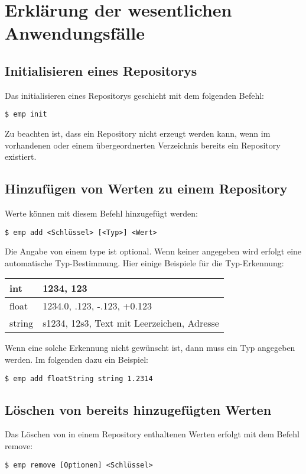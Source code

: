 

\section{Erklärung der wesentlichen Anwendungsfälle}

\subsection{Initialisieren eines Repositorys}
Das initialisieren eines Repositorys geschieht mit dem folgenden Befehl:
\begin{lstlisting}[style=Bash]
$ emp init
\end{lstlisting}
Zu beachten ist, dass ein Repository nicht erzeugt werden kann, wenn im vorhandenen oder einem übergeordnerten Verzeichnis bereits ein Repository existiert.

\subsection{Hinzufügen von Werten zu einem Repository}
Werte können mit diesem Befehl hinzugefügt werden:
\begin{lstlisting}[style=Bash]
$ emp add <Schlüssel> [<Typ>] <Wert>
\end{lstlisting}
Die Angabe von einem type ist optional. Wenn keiner angegeben wird erfolgt eine automatische Typ-Bestimmung.
Hier einige Beispiele für die Typ-Erkennung:

\begin{tabular}{| l | l |}
	\hline
	int & 1234, 123 \\
	\hline
	float & 1234.0, .123, -.123, +0.123 \\
	\hline
	string & s1234, 12s3, \grqq Text mit Leerzeichen\grqq , Adresse \\
	\hline
\end{tabular} 

Wenn eine solche Erkennung nicht gewünscht ist, dann muss ein Typ angegeben werden. Im folgenden dazu ein Beispiel:
\begin{lstlisting}[style=Bash]
$ emp add floatString string 1.2314
\end{lstlisting}

\subsection{Löschen von bereits hinzugefügten Werten}
Das Löschen von in einem Repository enthaltenen Werten erfolgt mit dem Befehl remove:
\begin{lstlisting}[style=Bash]
$ emp remove [Optionen] <Schlüssel>
\end{lstlisting}

